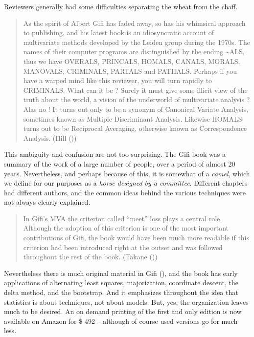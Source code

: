\documentclass[
  12pt,
  letterpaper,
  DIV=11,
  numbers=noendperiod]{scrreprt}
\begin{document}
Reviewers generally had some difficulties separating the wheat from the
chaff.

\begin{quote}
As the spirit of Albert Gifi has faded away, so has his whimsical
approach to publishing, and his latest book is an idiosyncratic account
of multivariate methods developed by the Leiden group during the 1970s.
The names of their computer programs are distinguished by the ending
\textasciitilde ALS, thus we have OVERALS, PRINCALS, HOMALS, CANALS,
MORALS, MANOVALS, CRIMINALS, PARTALS and PATHALS. Perhaps if you have a
warped mind like this reviewer, you will turn rapidly to CRIMINALS. What
can it be ? Surely it must give some illicit view of the truth about the
world, a vision of the underworld of multivariate analysis ? Alas no !
It turns out only to be a synonym of Canonical Variate Analysis,
sometimes known as Multiple Discriminant Analysis. Likewise HOMALS turns
out to be Reciprocal Averaging, otherwise known as Correspondence
Analysis. (Hill ())
\end{quote}

This ambiguity and confusion are not too surprising. The Gifi book was a
summary of the work of a large number of people, over a period of almost
20 years. Nevertheless, and perhaps because of this, it is somewhat of a
\emph{camel}, which we define for our purposes as a \emph{horse designed
by a committee}. Different chapters had different authors, and the
common ideas behind the various techniques were not always clearly
explained.

\begin{quote}
In Gifi's MVA the criterion called ``meet'' loss plays a central role.
Although the adoption of this criterion is one of the most important
contributions of Gifi, the book would have been much more readable if
this criterion had been introduced right at the outset and was followed
throughout the rest of the book. (Takane
())
\end{quote}

Nevertheless there is much original material in Gifi
(), and the book has early applications of
alternating least squares, majorization, coordinate descent, the delta
method, and the bootstrap. And it emphasizes throughout the idea that
statistics is about techniques, not about models. But, yes, the
organization leaves much to be desired. An on demand printing of the
first and only edition is now available on Amazon for \$ 492 -- although
of course used versions go for much less.
\end{document}
